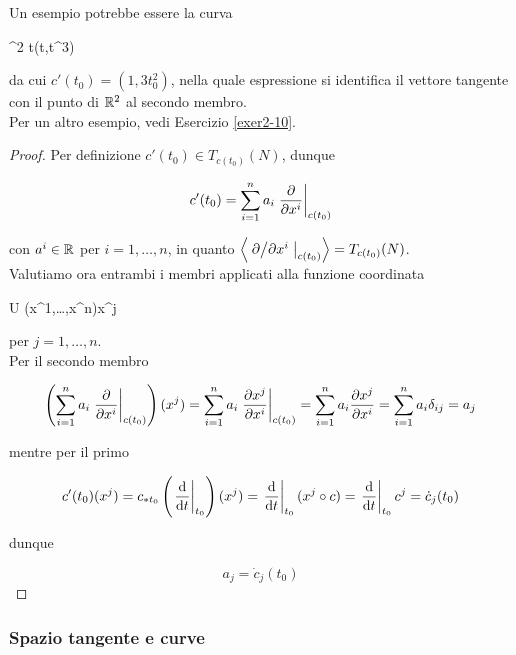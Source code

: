 Un esempio potrebbe essere la curva

	{\R}{\R^{2}}
	{t}{(t,t^{3})}

da cui $ c'(t_{0}) = (1, 3 t_{0}^{2}) $, nella quale espressione si identifica il vettore tangente con il punto di $ \mathbb{R}^{2} $ al secondo membro. \\
Per un altro esempio, vedi Esercizio \ref{exer2-10}.

\begin{proof}
	Per definizione $ c'(t_{0}) \in T_{c(t_{0})}(N) $, dunque
	
	\begin{equation}
		c'(t_{0}) = \sum_{i=1}^{n} a_{i} \eval{ \pdv{x^{i}} }_{c(t_{0})}
	\end{equation}

	con $ a^{i} \in \mathbb{R} $ per $ i=1,\dots,n $, in quanto $ \ev{ \eval{ \pdv*{x^{i}} }_{c(t_{0})} } = T_{c(t_{0})}(N) $. \\
	Valutiamo ora entrambi i membri applicati alla funzione coordinata
	
		{U}{\R}
		{(x^{1},\dots,x^{n})}{x^{j}}

	per $ j=1,\dots,n $. \\
	Per il secondo membro
	
	\begin{equation}
		\left( \sum_{i=1}^{n} a_{i} \eval{ \pdv{x^{i}} }_{c(t_{0})} \right) (x^{j}) = \sum_{i=1}^{n} a_{i} \eval{ \pdv{x^{j}}{x^{i}} }_{c(t_{0})} %
		= \sum_{i=1}^{n} a_{i} \pdv{x^{j}}{x^{i}} %
		= \sum_{i=1}^{n} a_{i} \delta_{ij} %
		= a_{j}
	\end{equation}

	mentre per il primo
	
	\begin{equation}
		c'(t_{0})(x^{j}) = c_{*t_{0}} \left( \eval{ \dv{t} }_{t_{0}} \right)(x^{j}) %
		= \eval{ \dv{t} }_{t_{0}} (x^{j} \circ c) %
		= \eval{ \dv{t} }_{t_{0}} c^{j} %
		= \dot{c}_{j}(t_{0})
	\end{equation}

	dunque
	
	\begin{equation}
		a_{j} = \dot{c}_{j}(t_{0})
	\end{equation}
\end{proof}

\subsubsection{Spazio tangente e curve}

